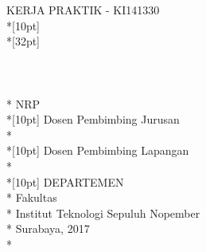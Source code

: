 \newpage

	\sffamily
	\thispagestyle{empty}
	\color{white}
	{ \noindent KERJA PRAKTIK - KI141330 }\\*[10pt] 
	{\large\textbf{\MakeUppercase{\judul}}} \\*[32pt]
	\\
	\\
	\\
	\MakeUppercase{\penulis} \\*
	NRP \nrp \\*[10pt]
	Dosen Pembimbing Jurusan \\*
	\pembimbingJurusan \\*[10pt]
	Dosen Pembimbing Lapangan \\*
	\pembimbingLapangan \\*[10pt]
	DEPARTEMEN \MakeUppercase{\jurusan} \\*
	Fakultas \fakultas \\*
	Institut Teknologi Sepuluh Nopember \\*
	Surabaya, 2017 \\*
	\rmfamily
	\normalsize
	\restoregeometry
	\color{black}
	\cleardoublepage
	
